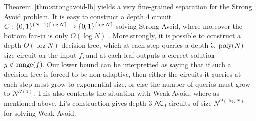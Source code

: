 

%



Theorem~\ref{thm:strongavoid-lb} yields a very fine-grained separation for the {\sc Strong Avoid} problem. It is easy to construct a depth 4 circuit $C:\{0,1\}^{(N-1)\lceil \log N \rceil} \to \{0,1\}^{\lceil \log N \rceil}$ solving {\sc Strong Avoid}, where moreover the bottom fan-in is only $O(\log N)$ \cite{vyas-williams}. More strongly, it is possible to construct a depth $O(\log N)$ decision tree, which at each step queries a depth 3, $\mathrm{poly}(N)$ size circuit on the input $f$, and at each leaf outputs a correct solution $y \notin \mathrm{range}(f)$. Our lower bound can be interpretted as saying that if such a decision tree is forced to be non-adaptive, then either the circuits it queries at each step must grow to exponential size, or else the number of queries must grow to $N^{\Omega(1)}$. This also contrasts the situation with {\sc Weak Avoid}, where as mentioned above,  Li's construction gives depth-3 $\mathsf{AC}_0$ circuits of size $N^{O(\log N)}$ for solving {\sc Weak Avoid}.

